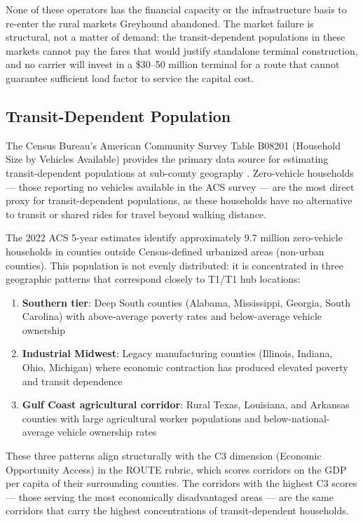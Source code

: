 None of these operators has the financial capacity or the infrastructure basis to re-enter the rural markets Greyhound abandoned. The market failure is structural, not a matter of demand: the transit-dependent populations in these markets cannot pay the fares that would justify standalone terminal construction, and no carrier will invest in a \$30--50 million terminal for a route that cannot guarantee sufficient load factor to service the capital cost.

\subsection{Transit-Dependent Population}

The Census Bureau's American Community Survey Table B08201 (Household Size by Vehicles Available) provides the primary data source for estimating transit-dependent populations at sub-county geography \citep{ACS_B08201_2022}. Zero-vehicle households --- those reporting no vehicles available in the ACS survey --- are the most direct proxy for transit-dependent populations, as these households have no alternative to transit or shared rides for travel beyond walking distance.

The 2022 ACS 5-year estimates identify approximately 9.7 million zero-vehicle households in counties outside Census-defined urbanized areas (non-urban counties). This population is not evenly distributed: it is concentrated in three geographic patterns that correspond closely to T1/T1 hub locations:
\begin{enumerate}
  \item \textbf{Southern tier}: Deep South counties (Alabama, Mississippi, Georgia, South Carolina) with above-average poverty rates and below-average vehicle ownership \citep{ACS_B08201_2022}
  \item \textbf{Industrial Midwest}: Legacy manufacturing counties (Illinois, Indiana, Ohio, Michigan) where economic contraction has produced elevated poverty and transit dependence
  \item \textbf{Gulf Coast agricultural corridor}: Rural Texas, Louisiana, and Arkansas counties with large agricultural worker populations and below-national-average vehicle ownership rates
\end{enumerate}

These three patterns align structurally with the C3 dimension (Economic Opportunity Access) in the ROUTE rubric, which scores corridors on the GDP per capita of their surrounding counties. The corridors with the highest C3 scores --- those serving the most economically disadvantaged areas --- are the same corridors that carry the highest concentrations of transit-dependent households.

